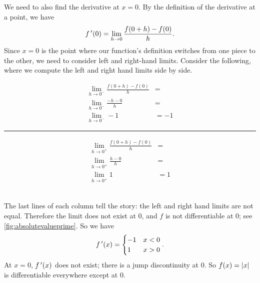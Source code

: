 \begin{example}
We need to also find the derivative at $x=0$. By the definition of the derivative at a point, we have
\[f\,'(0) = \lim_{h\to0}\frac{f(0+h)-f(0)}{h}.\]
Since $x=0$ is the point where our function's definition switches from one piece to the other, we need to consider left and right-hand limits. Consider the following, where we compute the left and right hand limits side by side.\\
\begin{minipage}[b]{.49\linewidth}
\begin{align*}
\lim_{h\to0^-}\frac{f(0+h)-f(0)}{h} &= \\
\lim_{h\to0^-}\frac{-h-0}{h} &= \\
\lim_{h\to0^-}-1 & =-1
\end{align*}
\end{minipage}\rule{.5pt}{70pt}%
\begin{minipage}[b]{.49\linewidth}
\begin{align*}
\lim_{h\to0^+}\frac{f(0+h)-f(0)}{h} &= \\
\lim_{h\to0^+}\frac{h-0}{h} &= \\
\lim_{h\to0^+}1 & =1
\end{align*}
\end{minipage}\\
%
%
\noindent
The last lines of each column tell the story: the left and right hand limits are not equal. Therefore the limit does not exist at 0, and $f$ is not differentiable at 0; see \autoref{fig:absolutevalueprime}.\vspace{-.3\baselineskip}
So we have
\[f\,'(x) = \begin{cases} -1 & x<0 \\ 1 & x>0\end{cases}.\] 
At $x=0$, $f\,'(x)$ does not exist; there is a jump discontinuity at 0. So $f(x) = \left\lvert x \right\rvert$ is differentiable everywhere except at 0.
\end{example}

